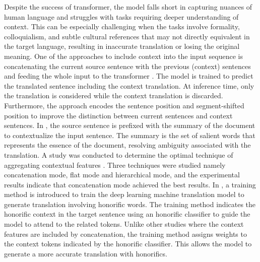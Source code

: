 \documentclass[preprint,12pt]{elsarticle}
\begin{document}
Despite the success of transformer, the model falls short in capturing nuances of human language and struggles with tasks requiring deeper understanding of context. This can be especially challenging when the tasks involve formality, colloquialism, and subtle cultural references that may not directly equivalent in the target language, resulting in inaccurate translation or losing the original meaning. One of the approaches to include context into the input sequence is concatenating the current source sentence with the previous (context) sentences and feeding the whole input to the transformer \citep{lupo_encoding_2023}. The model is trained to predict the translated sentence including the context translation. At inference time, only the translation is considered while the context translation is discarded. Furthermore, the approach encodes the sentence position and segment-shifted position to improve the distinction between current sentences and context sentences. In \citep{rippeth_improving_2023}, the source sentence is prefixed with the summary of the document to contextualize the input sentence. The summary is the set of salient words that represents the essence of the document, resolving ambiguity associated with the translation. A study was conducted to determine the optimal technique of aggregating contextual features \citep{wu_study_2022}. Three techniques were studied namely concatenation mode, flat mode and hierarchical mode, and the experimental results indicate that concatenation mode achieved the best results. In \citep{kim_towards_2023}, a training method is introduced to train the deep learning machine translation model to generate translation involving honorific words. The training method indicates the honorific context in the target sentence using an honorific classifier to guide the model to attend to the related tokens. Unlike other studies where the context features are included by concatenation, the training method assigns weights to the context tokens indicated by the honorific classifier. This allows the model to generate a more accurate translation with honorifics. 
\end{document}
